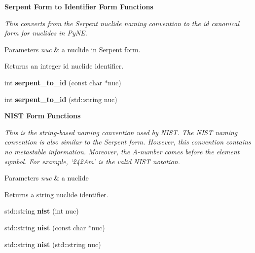 \begin{Indent}{\bf Serpent Form to Identifier Form Functions}\par
{\em This converts from the Serpent nuclide naming convention to the id canonical form for nuclides in Py\+NE. 
\begin{DoxyParams}{Parameters}
{\em nuc} & a nuclide in Serpent form. \\
\hline
\end{DoxyParams}
\begin{DoxyReturn}{Returns}
an integer id nuclide identifier. 
\end{DoxyReturn}
}\begin{DoxyCompactItemize}
\item 
int {\bfseries serpent\+\_\+to\+\_\+id} (const char $\ast$nuc)\hypertarget{namespacepyne_1_1nucname_a9ffbb8149309dd3cb78931c05275fe9d}{}\label{namespacepyne_1_1nucname_a9ffbb8149309dd3cb78931c05275fe9d}

\item 
int {\bfseries serpent\+\_\+to\+\_\+id} (std\+::string nuc)\hypertarget{namespacepyne_1_1nucname_a23cb9b915047f2aac156e9c102f96fc7}{}\label{namespacepyne_1_1nucname_a23cb9b915047f2aac156e9c102f96fc7}

\end{DoxyCompactItemize}
\end{Indent}
\begin{Indent}{\bf N\+I\+ST Form Functions}\par
{\em This is the string-\/based naming convention used by N\+I\+ST. The N\+I\+ST naming convention is also similar to the Serpent form. However, this convention contains no metastable information. Moreover, the A-\/number comes before the element symbol. For example, ‘242\+Am’ is the valid N\+I\+ST notation. 
\begin{DoxyParams}{Parameters}
{\em nuc} & a nuclide \\
\hline
\end{DoxyParams}
\begin{DoxyReturn}{Returns}
a string nuclide identifier. 
\end{DoxyReturn}
}\begin{DoxyCompactItemize}
\item 
std\+::string {\bfseries nist} (int nuc)\hypertarget{namespacepyne_1_1nucname_ab7a6f2f0459c253bc311fbbd62e00a38}{}\label{namespacepyne_1_1nucname_ab7a6f2f0459c253bc311fbbd62e00a38}

\item 
std\+::string {\bfseries nist} (const char $\ast$nuc)\hypertarget{namespacepyne_1_1nucname_a44a1695692f023e1b6ac104adc11f10b}{}\label{namespacepyne_1_1nucname_a44a1695692f023e1b6ac104adc11f10b}

\item 
std\+::string {\bfseries nist} (std\+::string nuc)\hypertarget{namespacepyne_1_1nucname_aa4c79af1530cdae7db618209167d17da}{}\label{namespacepyne_1_1nucname_aa4c79af1530cdae7db618209167d17da}

\end{DoxyCompactItemize}
\end{Indent}
